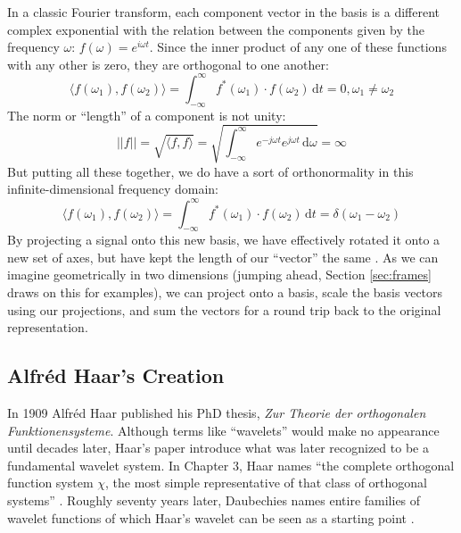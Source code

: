 \documentclass[letterpaper]{article}
\begin{document}
In a classic Fourier transform, each component vector in the basis is a different complex exponential
with the relation between the components given by the frequency \( \omega \):
\( f(\omega) = e^{i \omega t} \).
Since the inner product of any one of these functions with any other is zero, they are orthogonal to one another:
\[ \langle f(\omega_1), f(\omega_2)\rangle = \int_{-\infty}^{\infty} f^*(\omega_1)\cdot f(\omega_2) \,\mathrm{d}t = 0 , \omega_1 \neq \omega_2 \]
The norm or ``length'' of a component is not unity:
\[ ||f|| = \sqrt{\langle f, f\rangle} = \sqrt{\int_{-\infty}^{\infty} e^{-j\omega t} e^{j\omega t} \,\mathrm{d}\omega } = \infty \]
But putting all these together, we do have a sort of orthonormality in this infinite-dimensional frequency domain:
\[ \langle f(\omega_1), f(\omega_2)\rangle = \int_{-\infty}^{\infty} f^*(\omega_1)\cdot f(\omega_2) \,\mathrm{d}t = \delta(\omega_1 - \omega_2) \]
By projecting a signal onto this new basis, we have effectively rotated it onto a new set of axes, but have kept the length of our ``vector'' the same \cite[p.~xi]{strang}.
As we can imagine geometrically in two dimensions (jumping ahead, Section \ref{sec:frames} draws on this for examples),
we can project onto a basis, scale the basis vectors using our projections, and sum the vectors for a round trip back to the original representation.

\subsection{Alfréd Haar's Creation}

In 1909 Alfr\'{e}d Haar published his PhD thesis, \emph{Zur Theorie der orthogonalen Funktionensysteme}.
Although terms like ``wavelets'' would make no appearance until decades later,
Haar's paper introduce what was later recognized to be a fundamental wavelet system.
In Chapter 3, Haar names ``the complete orthogonal function system \(\chi\), the most simple representative of
that class of orthogonal systems'' \cite{haar}.
Roughly seventy years later, Daubechies names entire families of wavelet functions of which Haar's wavelet 
can be seen as a starting point \cite[p.~16]{daub}.
\end{document}
